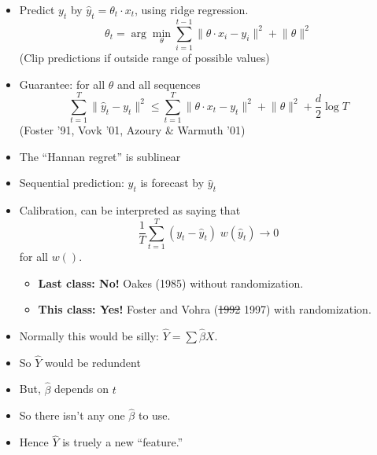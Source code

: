 \documentclass[landscape]{slides}
\begin{document}

\begin{itemize}
\item Predict $y_t$ by $\hat{y}_t = \theta_t \cdot x_t$, using ridge
regression.
\begin{displaymath}
\theta_t = \arg\min_\theta\sum_{i=1}^{t-1}\lVert\theta\cdot x_i-y_i\rVert^2 + \lVert\theta\rVert^2
\end{displaymath}
(Clip predictions if outside range of possible values)
\item Guarantee: for all $\theta$ and all sequences
\begin{displaymath}
\sum_{t=1}^T\lVert\hat{y}_t - y_t\rVert^2 \le \sum_{t=1}^T\lVert\theta\cdot x_t -
y_t\rVert^2 + \lVert \theta \rVert^2 + \frac{d}{2} \log T
\end{displaymath}
(Foster '91, Vovk '01, Azoury \& Warmuth '01)
\item  The ``Hannan regret'' is sublinear
\end{itemize}



\begin{itemize}
\item Sequential prediction: $y_t$ is forecast by $\hat{y}_t$
\item Calibration, can be interpreted as saying that
\begin{displaymath}
\frac{1}{T} \sum_{t=1}^T (y_t - \hat{y}_t) \; w(\hat{y}_t) \to 0 
\end{displaymath}
for all $w()$.
\begin{itemize}
\item {\bf Last class: No!}  Oakes (1985)  without randomization.
\item {\bf This class: Yes!} Foster and Vohra ({\color{red}\sout{1992}} 1997) with randomization.
\end{itemize}
\end{itemize}



\begin{itemize}
\item Normally this would be silly: $\hat Y = \sum \hat \beta X$.
\item So $\hat Y$ would be redundent
\item But, $\hat\beta$ depends on $t$
\item So there isn't any one $\hat\beta$ to use.
\item Hence $\hat Y$ is truely a new ``feature.''
\end{itemize}
\end{document}
